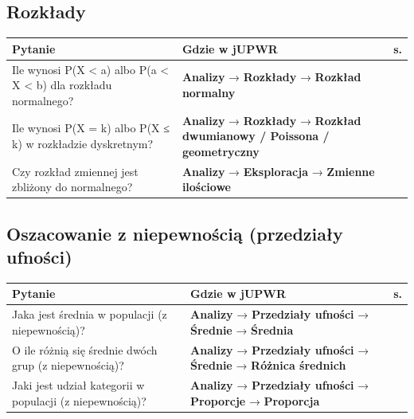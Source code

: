 \documentclass[
  polish,
  10pt,
  a4paper,
  DIV=11,
  numbers=noendperiod]{scrartcl}
\newcommand{\jmenu}[1]{{\color{upwraccent}\small #1}}
\begin{document}

\subsection{Rozkłady}\label{rozkux142ady}

\begin{longtable*}{@{}p{6.4cm}p{9.2cm}r@{}}
\toprule
\textbf{Pytanie} & \textbf{Gdzie w jUPWR} & \textbf{s.} \\
\midrule
\endhead
Ile wynosi P(X \textless{} a) albo P(a \textless{} X \textless{} b) dla rozkładu normalnego? & \jmenu{\textbf{Analizy} → \textbf{Rozkłady} → \textbf{Rozkład normalny}} & \pageref{w:rozklad-normalny} \\[2pt]
Ile wynosi P(X = k) albo P(X ≤ k) w rozkładzie dyskretnym? & \jmenu{\textbf{Analizy} → \textbf{Rozkłady} → \textbf{Rozkład dwumianowy / Poissona / geometryczny}} & \pageref{w:rozklady-dyskretne} \\[2pt]
Czy rozkład zmiennej jest zbliżony do normalnego? & \jmenu{\textbf{Analizy} → \textbf{Eksploracja} → \textbf{Zmienne ilościowe}} & \pageref{w:normalnosc} \\[2pt]
\bottomrule
\end{longtable*}


\subsection{Oszacowanie z niepewnością (przedziały
ufności)}\label{oszacowanie-z-niepewnoux15bciux105-przedziaux142y-ufnoux15bci}

\begin{longtable*}{@{}p{6.4cm}p{9.2cm}r@{}}
\toprule
\textbf{Pytanie} & \textbf{Gdzie w jUPWR} & \textbf{s.} \\
\midrule
\endhead
Jaka jest średnia w populacji (z niepewnością)? & \jmenu{\textbf{Analizy} → \textbf{Przedziały ufności} → \textbf{Średnie} → \textbf{Średnia}} & \pageref{w:ci-srednia} \\[2pt]
O ile różnią się średnie dwóch grup (z niepewnością)? & \jmenu{\textbf{Analizy} → \textbf{Przedziały ufności} → \textbf{Średnie} → \textbf{Różnica średnich}} & \pageref{w:ci-roznica-srednich} \\[2pt]
Jaki jest udział kategorii w populacji (z niepewnością)? & \jmenu{\textbf{Analizy} → \textbf{Przedziały ufności} → \textbf{Proporcje} → \textbf{Proporcja}} & \pageref{w:ci-proporcja} \\[2pt]
\bottomrule
\end{longtable*}
\end{document}
